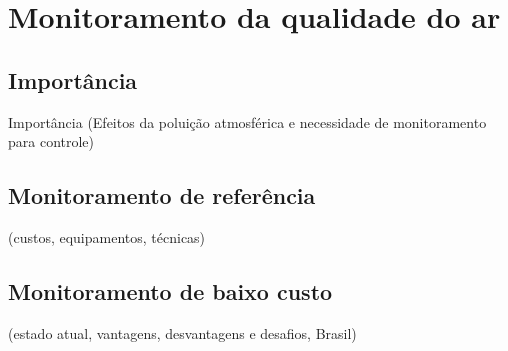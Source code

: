 \chapter{Monitoramento da qualidade do ar}


\section{Importância}

Importância (Efeitos da poluição atmosférica e necessidade de monitoramento para controle)

\section{Monitoramento de referência}

(custos, equipamentos, técnicas)

\section{Monitoramento de baixo custo}

(estado atual, vantagens, desvantagens e desafios, Brasil)